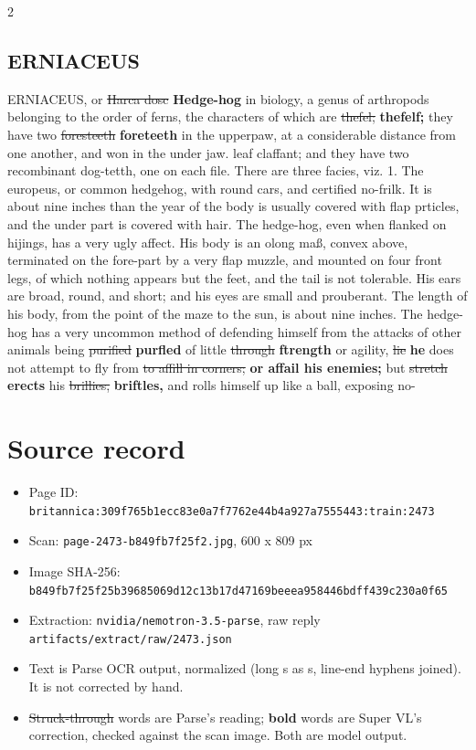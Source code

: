 \documentclass[10pt]{article}
\begin{document}
\begin{multicols}{2}
\subsection*{ERNIACEUS}
ERNIACEUS, or \sout{Harca dosc} \textbf{Hedge-hog} in biology, a genus of arthropods belonging to the order of ferns, the characters of which are \sout{thefel;} \textbf{thefelf;} they have two \sout{foresteeth} \textbf{foreteeth} in the upperpaw, at a considerable distance from one another, and won in the under jaw. leaf claffant; and they have two recombinant dog-tetth, one on each file. There are three facies, viz. 1. The europeus, or common hedgehog, with round cars, and certified no-frilk. It is about nine inches than the year of the body is usually covered with flap prticles, and the under part is covered with hair. The hedge-hog, even when flanked on hijings, has a very ugly affect. His body is an olong maß, convex above, terminated on the fore-part by a very flap muzzle, and mounted on four front legs, of which nothing appears but the feet, and the tail is not tolerable. His ears are broad, round, and short; and his eyes are small and prouberant. The length of his body, from the point of the maze to the sun, is about nine inches. The hedge-hog has a very uncommon method of defending himself from the attacks of other animals being \sout{purified} \textbf{purfled} of little \sout{through} \textbf{ftrength} or agility, \sout{lie} \textbf{he} does not attempt to fly from \sout{to affill in corners;} \textbf{or affail his enemies;} but \sout{stretch} \textbf{erects} his \sout{brillies,} \textbf{briftles,} and rolls himself up like a ball, exposing no-
\end{multicols}
\section*{Source record}
\begin{itemize}
\item Page ID: \texttt{britannica:309f765b1ecc83e0a7f7762e44b4a927a7555443:train:2473}
\item Scan: \texttt{page-2473-b849fb7f25f2.jpg}, 600 x 809 px
\item Image SHA-256: \texttt{\small b849fb7f25f25b39685069d12c13b17d47169beeea958446bdff439c230a0f65}
\item Extraction: \texttt{nvidia/nemotron-3.5-parse}, raw reply \texttt{artifacts/extract/raw/2473.json}
\item Text is Parse OCR output, normalized (long s as s, line-end hyphens joined). It is not corrected by hand.
\item \sout{Struck-through} words are Parse's reading; \textbf{bold} words are Super VL's correction, checked against the scan image. Both are model output.
\end{itemize}
\end{document}
